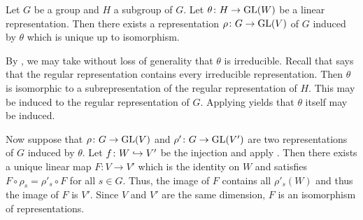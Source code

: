 \documentclass[letterpaper, 11pt, oneside]{book}
\begin{document}
\begin{thrm}
  Let $G$ be a group and $H$ a subgroup of $G$.
  Let $\theta\colon H \to \operatorname{GL}(W)$ be a linear representation.
  Then there exists a representation $\rho\colon G \to \operatorname{GL}(V)$ of $G$ induced by $\theta$ which is unique up to isomorphism.
\end{thrm}
\begin{pf}
  By , we may take without loss of generality that $\theta$ is irreducible.
  Recall that  says that the regular representation contains every irreducible representation.
  Then $\theta$ is isomorphic to a subrepresentation of the regular representation of $H$.
  This may be induced to the regular representation of $G$.
  Applying  yields that $\theta$ itself may be induced.

  Now suppose that $\rho\colon G \to \operatorname{GL}(V)$ and $\rho'\colon G \to \operatorname{GL}(V')$ are two representations of $G$ induced by $\theta$.
  Let $f\colon W \into V'$ be the injection and apply .
  Then there exists a unique linear map $F\colon V \to V'$ which is the identity on $W$ and satisfies $F \circ \rho_{s} = \rho'_{s} \circ F$ for all $s \in G$.
  Thus, the image of $F$ contains all $\rho'_{s}(W)$ and thus the image of $F$ is $V'$.
  Since $V$ and $V'$ are the same dimension, $F$ is an isomorphism of representations.
\end{pf}
\end{document}

